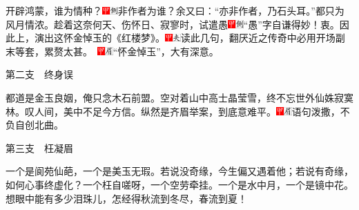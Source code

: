 开辟鸿蒙，谁为情种？{\includegraphics[width=3mm]{../Images/00002}\includegraphics[width=3mm]{../Images/00011}\footnotesize \kaishu 非作者为谁？余又曰：``亦非作者，乃石头耳。''}都只为风月情浓。趁着这奈何天、伤怀日、寂寥时，试遣愚{\includegraphics[width=3mm]{../Images/00002}\includegraphics[width=3mm]{../Images/00011}\footnotesize \kaishu ``愚''字自谦得妙！}衷。因此上，演出这怀金悼玉的《红楼梦》。{\includegraphics[width=3mm]{../Images/00002}\includegraphics[width=3mm]{../Images/00012}\footnotesize \kaishu 读此几句，翻厌近之传奇中必用开场副末等套，累赘太甚。　\includegraphics[width=3mm]{../Images/00002}\includegraphics[width=3mm]{../Images/00010}\footnotesize \kaishu ``怀金悼玉''，大有深意。}

第二支　终身误

都道是金玉良姻，俺只念木石前盟。空对着山中高士晶莹雪，终不忘世外仙姝寂寞林。叹人间，美中不足今方信。纵然是齐眉举案，到底意难平。{\includegraphics[width=3mm]{../Images/00002}\includegraphics[width=3mm]{../Images/00010}\footnotesize \kaishu 语句泼撒，不负自创北曲。}

第三支　枉凝眉

一个是阆苑仙葩，一个是美玉无瑕。若说没奇缘，今生偏又遇着他；若说有奇缘，如何心事终虚化？一个枉自嗟呀，一个空劳牵挂。一个是水中月，一个是镜中花。想眼中能有多少泪珠儿，怎经得秋流到冬尽，春流到夏！

